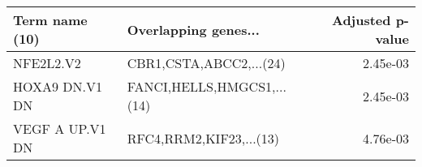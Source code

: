 \begin{tabular}{llr}
\toprule
 Term name (10) &       Overlapping genes... &  Adjusted p-value \\
\midrule
      NFE2L2.V2 &    CBR1,CSTA,ABCC2,...(24) &          2.45e-03 \\
 HOXA9 DN.V1 DN & FANCI,HELLS,HMGCS1,...(14) &          2.45e-03 \\
VEGF A UP.V1 DN &    RFC4,RRM2,KIF23,...(13) &          4.76e-03 \\
\bottomrule
\end{tabular}
